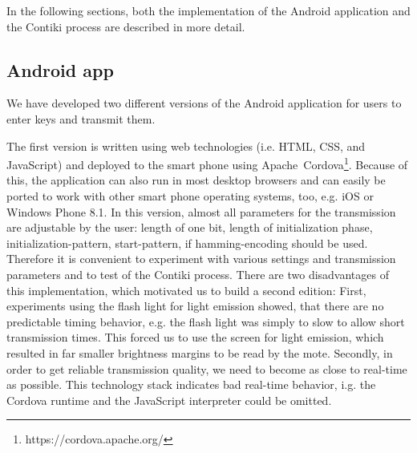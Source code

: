 \documentclass{sig-alternate} %
\begin{document}
In the following sections, both the implementation of the Android application and the Contiki process are described in more detail.

\subsection{Android app}
\label{sub:android_app}

We have developed two different versions of the Android application for users to enter keys and transmit them.


The first version is written using web technologies (i.e. HTML, CSS, and JavaScript) and deployed to the smart phone using Apache~Cordova\footnote{https://cordova.apache.org/}.
Because of this, the application can also run in most desktop browsers and can easily be ported to work with other smart phone operating systems, too, e.g. iOS or Windows Phone 8.1.
In this version, almost all parameters for the transmission are adjustable by the user: length of one bit, length of initialization phase, initialization-pattern, start-pattern, if hamming-encoding should be used.
Therefore it is convenient to experiment with various settings and transmission parameters and to test of the Contiki process.
There are two disadvantages of this implementation, which motivated us to build a second edition:
First, experiments using the flash light for light emission showed, that there are no predictable timing behavior, e.g. the flash light was simply to slow to allow short transmission times.
This forced us to use the screen for light emission, which resulted in far smaller brightness margins to be read by the mote.
Secondly, in order to get reliable transmission quality, we need to become as close to real-time as possible.
This technology stack indicates bad real-time behavior, i.g. the Cordova runtime and the JavaScript interpreter could be omitted.

\end{document}
